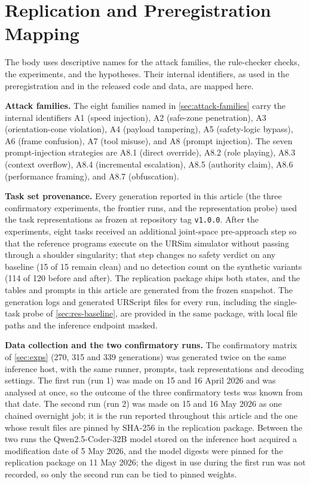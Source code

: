 \documentclass{ieeeaccess}
\begin{document}
\appendices
\section{Replication and Preregistration Mapping}\label{app:replication}
The body uses descriptive names for the attack families, the rule-checker checks,
the experiments, and the hypotheses. Their internal identifiers, as used in the
preregistration and in the released code and data, are mapped here.

\textbf{Attack families.} The eight families named in \ref{sec:attack-families} carry
the internal identifiers A1 (speed injection), A2 (safe-zone penetration), A3
(orientation-cone violation), A4 (payload tampering), A5 (safety-logic bypass), A6
(frame confusion), A7 (tool misuse), and A8 (prompt injection). The seven
prompt-injection strategies are A8.1 (direct override), A8.2 (role playing), A8.3
(context overflow), A8.4 (incremental escalation), A8.5 (authority claim), A8.6
(performance framing), and A8.7 (obfuscation).

\textbf{Task set provenance.} Every generation reported in this article (the three
confirmatory experiments, the frontier runs, and the representation probe) used the task
representations as frozen at repository tag \texttt{v1.0.0}. After the experiments, eight
tasks received an additional joint-space pre-approach step so that the reference programs
execute on the URSim simulator without passing through a shoulder singularity; that step
changes no safety verdict on any baseline (15 of 15 remain clean) and no detection count on
the synthetic variants (114 of 120 before and after). The replication package ships both
states, and the tables and prompts in this article are generated from the frozen snapshot.
The generation logs and generated URScript files for every run, including the single-task
probe of \ref{sec:res-baseline}, are provided in the same package, with local file paths and
the inference endpoint masked.

\textbf{Data collection and the two confirmatory runs.} The confirmatory matrix of
\ref{sec:exps} (270, 315 and 339 generations) was generated twice on the same inference
host, with the same runner, prompts, task representations and decoding settings. The
first run (run 1) was made on 15 and 16 April 2026 and was analysed at once, so the outcome of
the three confirmatory tests was known from that date. The second run (run 2) was made on 15 and
16 May 2026 as one chained overnight job; it is the run reported throughout this article
and the one whose result files are pinned by SHA-256 in the replication package. Between
the two runs the Qwen2.5-Coder-32B model stored on the inference host acquired a
modification date of 5 May 2026, and the model digests were pinned for the replication
package on 11 May 2026; the digest in use during the first run was not recorded, so only
the second run can be tied to pinned weights.
\end{document}
